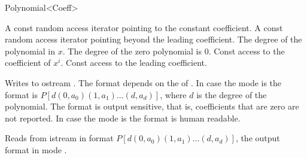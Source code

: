 \begin{ccRefClass}{Polynomial<Coeff>}
\ccTypes

\ccOperations

{A const random access iterator pointing to the constant coefficient.} \ccGlue
{}
{A const random access iterator pointing beyond the leading coefficient.}\ccGlue
{}
{The degree of the polynomial in $x$. The degree of the zero polynomial is 0.}\ccGlue
{}
{Const access to the coefficient of $x^i$.}\ccGlue
{}
{Const access to the leading coefficient.}\ccGlue


{Writes  to ostream . 
The format depends on the  of .
In case the mode is  the format is $P[d(0,a_0)(1,a_1)\dots(d,a_d)]$,
where $d$ is the degree of the polynomial. 
The format is output sensitive, that is, coefficients that are zero are not reported. 
In case the mode is  the format is human readable.}


{Reads  from istream  in format $P[d(0,a_0)(1,a_1)\dots(d,a_d)]$,  
the output format in mode .  }


\end{ccRefClass}
